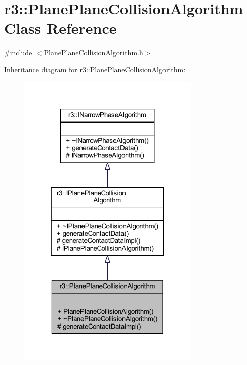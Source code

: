 \hypertarget{classr3_1_1_plane_plane_collision_algorithm}{}\section{r3\+:\+:Plane\+Plane\+Collision\+Algorithm Class Reference}
\label{classr3_1_1_plane_plane_collision_algorithm}


{\ttfamily \#include $<$Plane\+Plane\+Collision\+Algorithm.\+h$>$}



Inheritance diagram for r3\+:\+:Plane\+Plane\+Collision\+Algorithm\+:\nopagebreak
\begin{figure}[H]
\begin{center}
\leavevmode
\includegraphics[width=247pt]{classr3_1_1_plane_plane_collision_algorithm__inherit__graph}
\end{center}
\end{figure}


